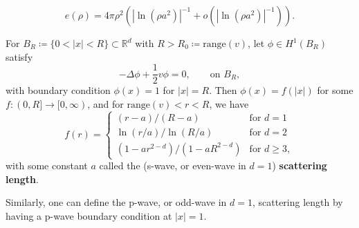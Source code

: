 \documentclass[final]{beamer}
\newcommand{\abs}[1]{\left\lvert #1 \right\rvert}
\newcommand{\R}{\mathbb{R}}
\newlength{\colwidth}
\begin{document}
\begin{frame}[t]
\begin{columns}[t]
\begin{column}{\colwidth}
\begin{tcolorbox}[colframe=qmathblue,colback=qmathbluelyslyslys,title=Set up and previous results]
		\begin{theorem}[$ d=2 $ result, \cite{lieb2001ground}]
			\begin{equation}
			e(\rho)=4\pi \rho^2\left(\abs{\ln(\rho a^2)}^{-1}+o(\abs{\ln(\rho a^2)}^{-1})\right) .
			\end{equation}
		\end{theorem}
		
		
		\end{tcolorbox}
		
		\begin{tcolorbox}[colframe=qmathblue,colback=qmathbluelyslyslys,title=The scattering length]
			\begin{theorem}
				For $ B_R\coloneqq\{0<\abs{x}<R\}\subset \R^d $ with $ R>R_0\coloneqq\text{range}(v) $, let $ \phi\in H^1(B_{R}) $ satisfy
				\begin{equation}
				-\Delta \phi +\frac12 v\phi=0,\qquad \text{on }B_R,
				\end{equation}
				with boundary condition $ \phi(x)=1 $ for $ \abs{x}=R$.
				Then $ \phi(x)=f(\abs{x}) $ for some $ f:(0,R]\to [0,\infty) $, and for $ \text{range}(v)<r<R $, we have \begin{equation}
				f(r)=\begin{cases}
				(r-a)/(R-a) &\text{for }d=1\\
				\ln(r/a)/\ln(R/a) &\text{for }d=2\\
				(1-ar^{2-d})/(1-aR^{2-d})&\text{for }d\geq 3,
				\end{cases}
				\end{equation}
				with some constant $ a $ called the (s-wave, or even-wave in $ d=1 $) \textbf{scattering length}.
			\end{theorem}
			Similarly, one can define the p-wave, or odd-wave in $ d=1 $, scattering length by having a p-wave boundary condition at $ \abs{x}=1 $.
		\end{tcolorbox}
			

\end{column}
\end{columns}
\end{frame}
\end{document}
